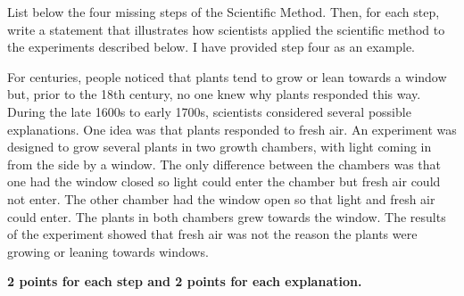 \showpoints
\question[16]
List below the four missing steps of the Scientific Method. Then,
for each step, write a statement that illustrates how scientists applied
the scientific method to the experiments described below. I have
provided step four as an example. 

For centuries, people noticed that plants tend to grow or lean towards a
window but, prior to the 18th century, no one knew why plants responded
this way. During the late 1600s to early 1700s, scientists considered
several possible explanations. One idea was that plants responded to
fresh air. An experiment was designed to grow several plants in two
growth chambers, with light coming in from the side by a window. The
only difference between the chambers was that one had the window closed
so light could enter the chamber but fresh air could not enter. The
other chamber had the window open so that light and fresh air could
enter. The plants in both chambers grew towards the window. The results
of the experiment showed that fresh air was not the reason the plants
were growing or leaning towards windows.


	\ifprintanswers\textbf{2 points for each step and 2 points for each explanation.}\fi
\hidepoints